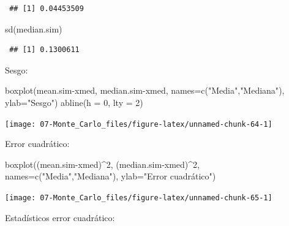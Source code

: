 \documentclass[
]{book}
\newenvironment{Shaded}{\begin{snugshade}}{\end{snugshade}}
\newcommand{\AttributeTok}[1]{\textcolor[rgb]{0.77,0.63,0.00}{#1}}
\newcommand{\DecValTok}[1]{\textcolor[rgb]{0.00,0.00,0.81}{#1}}
\newcommand{\FunctionTok}[1]{\textcolor[rgb]{0.00,0.00,0.00}{#1}}
\newcommand{\NormalTok}[1]{#1}
\newcommand{\SpecialCharTok}[1]{\textcolor[rgb]{0.00,0.00,0.00}{#1}}
\newcommand{\StringTok}[1]{\textcolor[rgb]{0.31,0.60,0.02}{#1}}
\theoremstyle{break}
\theoremstyle{nonumberplain}
\begin{document}
\begin{enumerate}
\begin{verbatim}
 ## [1] 0.04453509
\end{verbatim}

\begin{Shaded}
\begin{Highlighting}[]
\FunctionTok{sd}\NormalTok{(median.sim)}
\end{Highlighting}
\end{Shaded}

\begin{verbatim}
 ## [1] 0.1300611
\end{verbatim}

  Sesgo:

\begin{Shaded}
\begin{Highlighting}[]
\FunctionTok{boxplot}\NormalTok{(mean.sim}\SpecialCharTok{{-}}\NormalTok{xmed, median.sim}\SpecialCharTok{{-}}\NormalTok{xmed, }
      \AttributeTok{names=}\FunctionTok{c}\NormalTok{(}\StringTok{"Media"}\NormalTok{,}\StringTok{"Mediana"}\NormalTok{), }\AttributeTok{ylab=}\StringTok{"Sesgo"}\NormalTok{)}
\FunctionTok{abline}\NormalTok{(}\AttributeTok{h =} \DecValTok{0}\NormalTok{, }\AttributeTok{lty =} \DecValTok{2}\NormalTok{)}
\end{Highlighting}
\end{Shaded}

  \begin{center}\texttt{[image: 07-Monte\_Carlo\_files/figure-latex/unnamed-chunk-64-1]} \end{center}

  Error cuadrático:

\begin{Shaded}
\begin{Highlighting}[]
\FunctionTok{boxplot}\NormalTok{((mean.sim}\SpecialCharTok{{-}}\NormalTok{xmed)}\SpecialCharTok{\^{}}\DecValTok{2}\NormalTok{, (median.sim}\SpecialCharTok{{-}}\NormalTok{xmed)}\SpecialCharTok{\^{}}\DecValTok{2}\NormalTok{, }
      \AttributeTok{names=}\FunctionTok{c}\NormalTok{(}\StringTok{"Media"}\NormalTok{,}\StringTok{"Mediana"}\NormalTok{), }\AttributeTok{ylab=}\StringTok{"Error cuadrático"}\NormalTok{)}
\end{Highlighting}
\end{Shaded}

  \begin{center}\texttt{[image: 07-Monte\_Carlo\_files/figure-latex/unnamed-chunk-65-1]} \end{center}

  Estadísticos error cuadrático:


\end{enumerate}
\end{document}
